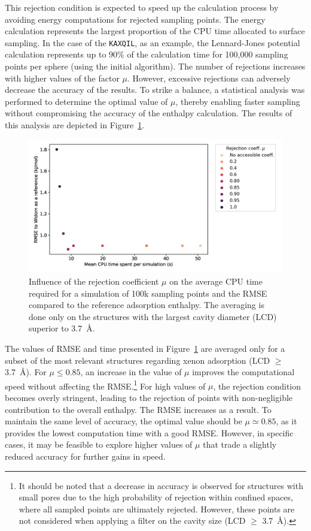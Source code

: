 \documentclass[main]{subfiles}
\begin{document}
This rejection condition is expected to speed up the calculation process by avoiding energy computations for rejected sampling points. The energy calculation represents the largest proportion of the CPU time allocated to surface sampling. In the case of the \texttt{KAXQIL}\autocite{Banerjee_2012}, as an example, the Lennard-Jones potential calculation represents up to $90\%$ of the calculation time for 100,000 sampling points per sphere (using the initial algorithm). The number of rejections increases with higher values of the factor $\mu$. However, excessive rejections can adversely decrease the accuracy of the results. To strike a balance, a statistical analysis was performed to determine the optimal value of $\mu$, thereby enabling faster sampling without compromising the accuracy of the enthalpy calculation. The results of this analysis are depicted in Figure~\ref{fgr:rejection}.

\begin{figure}[ht]
\centering
  \includegraphics[width=0.7\linewidth]{figures/3-fastsim/rejection_coeff_optimisation.jpg}
  \caption{Influence of the rejection coefficient $\mu$ on the average CPU time required for a simulation of 100k sampling points and the RMSE compared to the reference adsorption enthalpy. The averaging is done only on the structures with the largest cavity diameter (LCD) superior to \SI{3.7}{\angstrom}. }\label{fgr:rejection}
\end{figure}

The values of RMSE and time presented in Figure~\ref{fgr:rejection} are averaged only for a subset of the most relevant structures regarding xenon adsorption (LCD $\geq$ \SI{3.7}{\angstrom}). For $\mu\leq 0.85$, an increase in the value of $\mu$ improves the computational speed without affecting the RMSE.\footnote{It should be noted that a decrease in accuracy is observed for structures with small pores due to the high probability of rejection within confined spaces, where all sampled points are ultimately rejected. However, these points are not considered when applying a filter on the cavity size (LCD $\geq$ \SI{3.7}{\angstrom}).} For high values of $\mu$, the rejection condition becomes overly stringent, leading to the rejection of points with non-negligible contribution to the overall enthalpy. The RMSE increases as a result. To maintain the same level of accuracy, the optimal value should be $\mu \simeq 0.85$, as it provides the lowest computation time with a good RMSE. However, in specific cases, it may be feasible to explore higher values of $\mu$ that trade a slightly reduced accuracy for further gains in speed.
\end{document}

